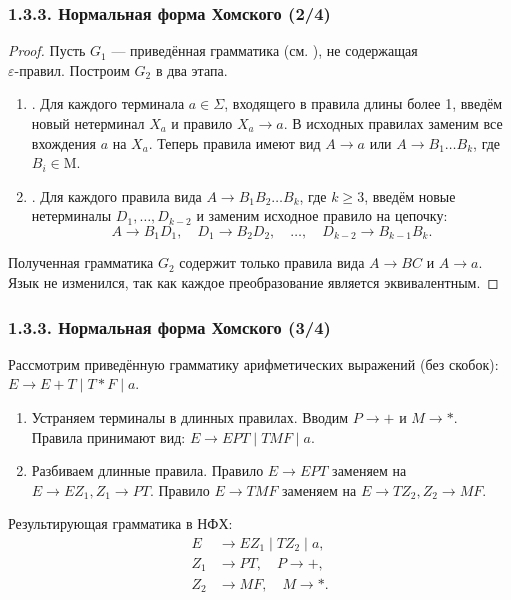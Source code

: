 \begin{frame}
\frametitle{1.3.3. Нормальная форма Хомского (2/4)}

\begin{proof}
Пусть $G_1$ — приведённая грамматика (см. ), не содержащая \\$\varepsilon$-правил.
Построим $G_2$ в два этапа.
\begin{enumerate}
    \item {}. 
    Для каждого терминала $a\in \Sigma$, входящего в правила длины более 1, введём новый нетерминал $X_a$ и правило $X_a \to a$.
    В исходных правилах заменим все вхождения $a$ на $X_a$.
    Теперь правила имеют вид $A \to a$ или $A \to B_1 \dots B_k$, где $B_i \in \mathrm{M}$.
    \item {}.
    Для каждого правила вида $A \to B_1 B_2 \dots B_k$, где $k \ge 3$, введём новые нетерминалы $D_1, \dots, D_{k-2}$ и заменим исходное правило на цепочку:
    $$
    A \to B_1 D_1, \quad D_1 \to B_2 D_2, \quad \dots, \quad D_{k-2} \to B_{k-1} B_k.
    $$
\end{enumerate}
Полученная грамматика $G_2$ содержит только правила вида $A \to BC$ и $A \to a$.
Язык не изменился, так как каждое преобразование является эквивалентным.
\end{proof}
\end{frame}
\begin{frame}
\frametitle{1.3.3. Нормальная форма Хомского (3/4)}

\begin{example}
Рассмотрим приведённую грамматику арифметических выражений (без скобок):
$E \to E+T \mid T*F \mid a$.
\begin{enumerate}
    \item Устраняем терминалы в длинных правилах. Вводим $P \to +$ и $M \to *$.
    Правила принимают вид:
    $E \to EPT \mid TMF \mid a$.
    \item Разбиваем длинные правила.
    Правило $E \to EPT$ заменяем на $E \to E Z_1, Z_1 \to PT$.
    Правило $E \to TMF$ заменяем на $E \to T Z_2, Z_2 \to MF$.
\end{enumerate}
Результирующая грамматика в НФХ:
$$
\begin{aligned}
E &\to E Z_1 \mid T Z_2 \mid a, \\
Z_1 &\to P T, \quad P \to +, \\
Z_2 &\to M F, \quad M \to *.
\end{aligned}
$$
\end{example}
\end{frame}

